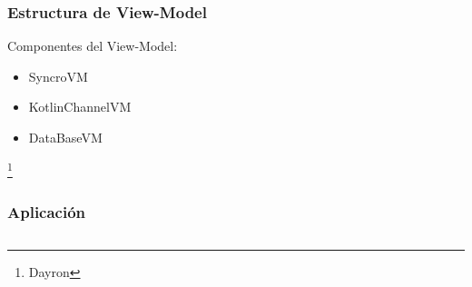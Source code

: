 \documentclass[14pt]{beamer}
\begin{document}
\begin{frame}
\frametitle{Estructura de View-Model}
Componentes del View-Model:
\begin{itemize}
\item SyncroVM
\item KotlinChannelVM
\item DataBaseVM


\end{itemize}

\footnote{Dayron}
\end{frame}


\begin{frame}
\frametitle{Aplicación}
\begin{columns}
\begin{column}{0.25\textwidth}
\begin{center}


\end{center}
\end{column}
\end{columns}
\end{frame}
\end{document}
